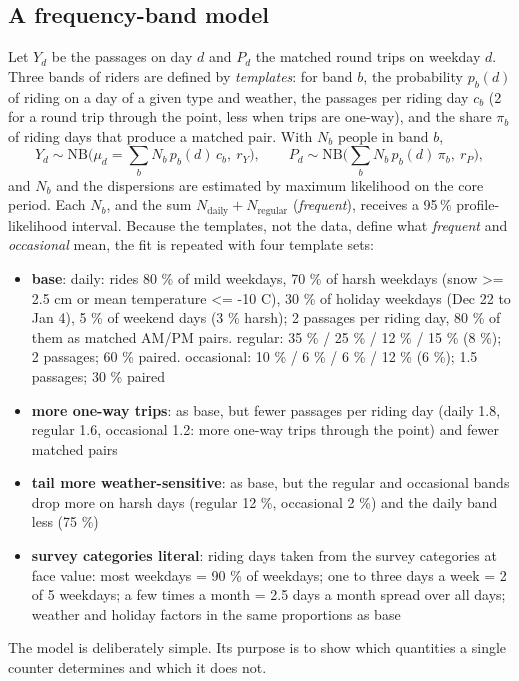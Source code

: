 \documentclass[11pt,a4paper]{article}
\begin{document}
\subsection{A frequency-band model}
Let $Y_d$ be the passages on day $d$ and $P_d$ the matched round trips on weekday $d$. Three bands of riders are defined by \emph{templates}: for band $b$, the probability $p_b(d)$ of riding on a day of a given type and weather, the passages per riding day $c_b$ (2 for a round trip through the point, less when trips are one-way), and the share $\pi_b$ of riding days that produce a matched pair. With $N_b$ people in band $b$,
\[ Y_d \sim \mathrm{NB}\Big(\mu_d = \sum_b N_b\, p_b(d)\, c_b,\ r_Y\Big), \qquad P_d \sim \mathrm{NB}\Big(\sum_b N_b\, p_b(d)\, \pi_b,\ r_P\Big), \]
and $N_b$ and the dispersions are estimated by maximum likelihood on the core period. Each $N_b$, and the sum $N_\text{daily} + N_\text{regular}$ (\emph{frequent}), receives a 95\,\% profile-likelihood interval. Because the templates, not the data, define what \emph{frequent} and \emph{occasional} mean, the fit is repeated with four template sets:
\begin{itemize}
\item \textbf{base}: daily: rides 80 \% of mild weekdays, 70 \% of harsh weekdays (snow >= 2.5 cm or mean temperature <= -10 C), 30 \% of holiday weekdays (Dec 22 to Jan 4), 5 \% of weekend days (3 \% harsh); 2 passages per riding day, 80 \% of them as matched AM/PM pairs. regular: 35 \% / 25 \% / 12 \% / 15 \% (8 \%); 2 passages; 60 \% paired. occasional: 10 \% / 6 \% / 6 \% / 12 \% (6 \%); 1.5 passages; 30 \% paired
\item \textbf{more one-way trips}: as base, but fewer passages per riding day (daily 1.8, regular 1.6, occasional 1.2: more one-way trips through the point) and fewer matched pairs
\item \textbf{tail more weather-sensitive}: as base, but the regular and occasional bands drop more on harsh days (regular 12 \%, occasional 2 \%) and the daily band less (75 \%)
\item \textbf{survey categories literal}: riding days taken from the survey categories at face value: most weekdays = 90 \% of weekdays; one to three days a week = 2 of 5 weekdays; a few times a month = 2.5 days a month spread over all days; weather and holiday factors in the same proportions as base
\end{itemize}
The model is deliberately simple. Its purpose is to show which quantities a single counter determines and which it does not.
\end{document}
